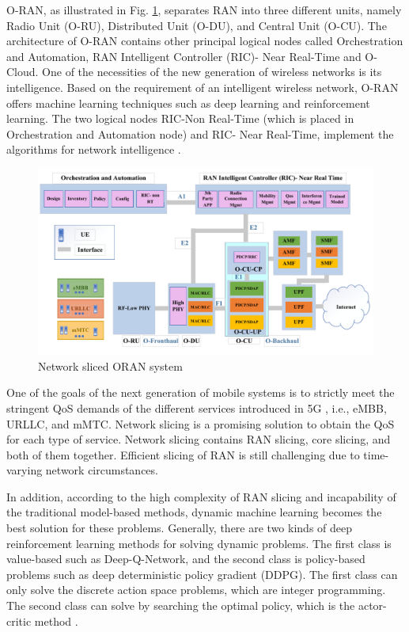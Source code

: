 \documentclass{article}
\begin{document}
O-RAN, as illustrated in Fig. \ref{fig:c11}, separates RAN into three different units, namely Radio Unit (O-RU), Distributed Unit (O-DU), and Central Unit (O-CU).
The architecture of O-RAN contains other principal logical nodes called Orchestration and Automation,
RAN Intelligent Controller (RIC)- Near Real-Time and O-Cloud. 
One of the necessities of the new generation of wireless networks is its intelligence.
Based on the requirement of an intelligent wireless network, O-RAN offers machine learning techniques such as deep learning and reinforcement learning. The two logical nodes RIC-Non Real-Time (which is placed in Orchestration and Automation node) and RIC- Near Real-Time, implement the algorithms for network intelligence
\cite{niknam2020intelligent,ORANArch,ORANML}.
\begin{figure}
  \centering 
    \includegraphics[scale = 0.5]{finalDraw.pdf}
  \caption{Network sliced ORAN system}
  \label{fig:c11}
\end{figure}


One of the goals of the next generation of mobile systems is to strictly meet the stringent QoS demands of the different services introduced in 5G , i.e., eMBB, URLLC, and mMTC. Network slicing is a promising solution to obtain the QoS for each type of service. Network slicing contains RAN slicing, core slicing, and both of them together. Efficient slicing of RAN is still challenging due to time-varying network circumstances.

In addition, according to the high complexity of RAN slicing and incapability of the traditional model-based methods, dynamic machine learning becomes the best solution for these problems.
 Generally, there are two kinds of deep reinforcement learning methods for solving dynamic problems. The first class is value-based such as Deep-Q-Network, and the second class is policy-based problems such as
deep deterministic policy gradient (DDPG). The first class can only solve the discrete action space problems, which are integer programming. The second class can solve by searching the optimal policy, which is the actor-critic method \cite{alsenwi2021intelligent,yan2019intelligent,mei2021intelligent}.
\end{document}
